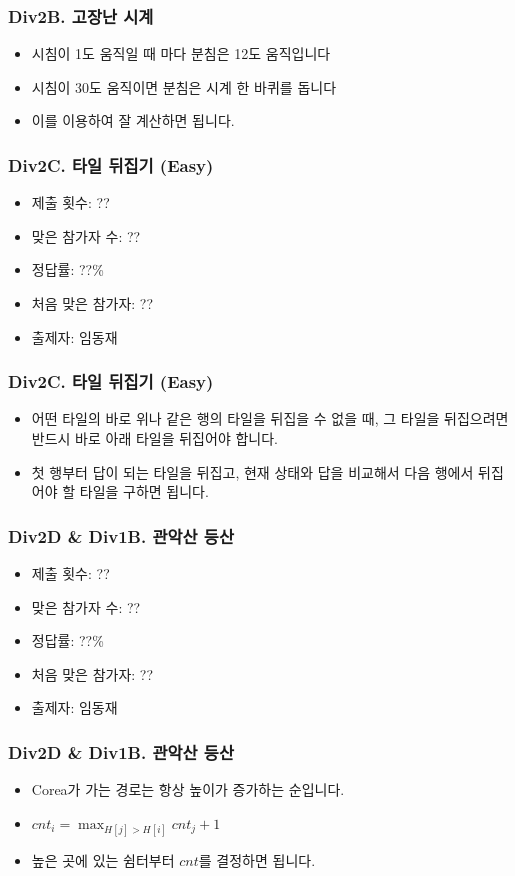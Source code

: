 \documentclass[xetex]{beamer}
\begin{document}
\begin{frame}
  \frametitle{Div2B. 고장난 시계}
  \begin{itemize}
    \item 시침이 1도 움직일 때 마다 분침은 12도 움직입니다
    \item 시침이 30도 움직이면 분침은 시계 한 바퀴를 돕니다
    \item 이를 이용하여 잘 계산하면 됩니다.
  \end{itemize}
\end{frame}

\begin{frame}
  \frametitle{Div2C. 타일 뒤집기 (Easy)}
  \begin{itemize}
    \item 제출 횟수: ??
    \item 맞은 참가자 수: ??
    \item 정답률: ??\%
    \item 처음 맞은 참가자: ??
    \item 출제자: 임동재
  \end{itemize}
\end{frame}

\begin{frame}
  \frametitle{Div2C. 타일 뒤집기 (Easy)}
  \begin{itemize}
    \item 어떤 타일의 바로 위나 같은 행의 타일을 뒤집을 수 없을 때, 그 타일을 뒤집으려면 반드시 바로 아래 타일을 뒤집어야 합니다.
    \item 첫 행부터 답이 되는 타일을 뒤집고, 현재 상태와 답을 비교해서 다음 행에서 뒤집어야 할 타일을 구하면 됩니다.
  \end{itemize}
\end{frame}

\begin{frame}
  \frametitle{Div2D \& Div1B. 관악산 등산}
  \begin{itemize}
    \item 제출 횟수: ??
    \item 맞은 참가자 수: ??
    \item 정답률: ??\%
    \item 처음 맞은 참가자: ??
    \item 출제자: 임동재
  \end{itemize}
\end{frame}

\begin{frame}
  \frametitle{Div2D \& Div1B. 관악산 등산}
  \begin{itemize}
    \item Corea가 가는 경로는 항상 높이가 증가하는 순입니다.
    \item $cnt_{i} = \max_{H[j] > H[i]} cnt_{j} + 1$
    \item 높은 곳에 있는 쉼터부터 $cnt$를 결정하면 됩니다.
  \end{itemize}
\end{frame}
\end{document}
